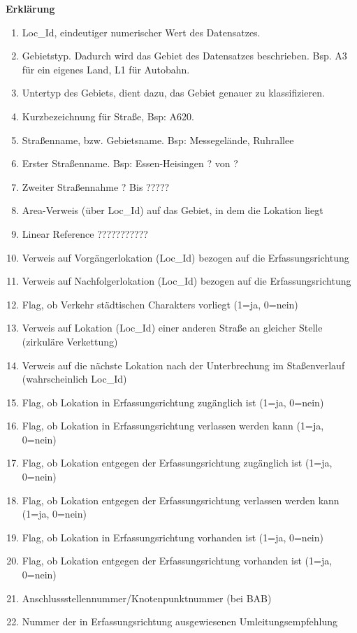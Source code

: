 \documentclass[12pt, a4paper, ngerman]{article}
\begin{document}
\textbf{Erklärung}
\begin{enumerate}
	\item Loc\_Id, eindeutiger numerischer Wert des Datensatzes.
	\item Gebietstyp. Dadurch wird das Gebiet des Datensatzes beschrieben. Bsp. A3 für ein eigenes Land, L1 für Autobahn.
	\item  Untertyp des Gebiets, dient dazu, das Gebiet genauer zu klassifizieren.
	\item Kurzbezeichnung für Straße, Bsp: A620.
	\item Straßenname, bzw. Gebietsname. Bsp: Messegelände, Ruhrallee
	\item Erster Straßenname. Bsp: Essen-Heisingen ? von ?
	\item Zweiter Straßennahme ? Bis ?????
	\item Area-Verweis (über Loc\_Id) auf das Gebiet, in dem die Lokation liegt
	\item Linear Reference ???????????
	\item Verweis auf Vorgängerlokation (Loc\_Id) bezogen auf die Erfassungsrichtung
	\item Verweis auf Nachfolgerlokation (Loc\_Id) bezogen auf die Erfassungsrichtung
	\item Flag, ob Verkehr städtischen Charakters vorliegt (1=ja, 0=nein)
	\item Verweis auf Lokation (Loc\_Id) einer anderen Straße an gleicher Stelle (zirkuläre Verkettung)
	\item Verweis auf die nächste Lokation nach der Unterbrechung im Staßenverlauf (wahrscheinlich Loc\_Id)
	\item Flag, ob Lokation in Erfassungsrichtung zugänglich ist (1=ja, 0=nein)
	\item Flag, ob Lokation in Erfassungsrichtung verlassen werden kann (1=ja, 0=nein)
	\item Flag, ob Lokation entgegen der Erfassungsrichtung zugänglich ist (1=ja, 0=nein)
	\item Flag, ob Lokation entgegen der Erfassungsrichtung verlassen werden kann (1=ja, 0=nein)
	\item Flag, ob Lokation in Erfassungsrichtung vorhanden ist (1=ja, 0=nein)
	\item Flag, ob Lokation entgegen der Erfassungsrichtung vorhanden ist (1=ja, 0=nein)
	\item Anschlussstellennummer/Knotenpunktnummer (bei BAB)
	\item Nummer der in Erfassungsrichtung ausgewiesenen Umleitungsempfehlung

\end{enumerate}
\end{document}
